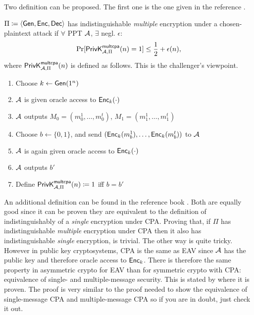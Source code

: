 \begin{solution}
  Two definition can be proposed.
  The first one is the one given in the reference \cite[p.~84]{katz2007introduction}.

  $\Pi \coloneqq \langle\operatorname{\mathsf{Gen}}, \operatorname{\mathsf{Enc}}, \operatorname{\mathsf{Dec}}\rangle$ has indistinguishable \emph{multiple} encryption under a chosen-plaintext attack
  if $\forall$ PPT $\mathcal{A}$, $\exists$ negl. $\epsilon$:
  \[ \Pr[\mathsf{PrivK}_{\mathcal{A},\Pi}^\mathsf{multcpa}(n) = 1] \leq \frac{1}{2} + \epsilon(n), \]
  where $\mathsf{PrivK}_{\mathcal{A},\Pi}^\mathsf{multcpa}(n)$ is defined as follows. This is the challenger's viewpoint.
  \begin{enumerate}
    \item Choose $k \leftarrow \operatorname{\mathsf{Gen}}(1^n)$
    \item $\mathcal{A}$ is given oracle access to $\operatorname{\mathsf{Enc}}_k(\cdot)$
    \item $\mathcal{A}$ outputs $M_0 = (m_0^1, \ldots, m_0^t)$, $M_1 = (m_1^1, \ldots, m_1^t)$
    \item Choose $b \leftarrow \{0,1\}$, and send $(\operatorname{\mathsf{Enc}}_k(m_b^1), \ldots, \operatorname{\mathsf{Enc}}_k(m_b^t))$ to $\mathcal{A}$
    \item $\mathcal{A}$ is again given oracle access to $\operatorname{\mathsf{Enc}}_k(\cdot)$
    \item $\mathcal{A}$ outputs $b'$
    \item Define $\mathsf{PrivK}_{\mathcal{A},\Pi}^\mathsf{multcpa}(n) \coloneqq 1$ iff $b = b'$
  \end{enumerate}

  An additional definition can be found in the reference book \cite[p.~75]{katz2007introduction}.
  Both are equally good since it can be proven they are equivalent to the definition of indistinguishably of a \emph{single} encryption
  under CPA.
  Proving that, if $\Pi$ has indistinguishable \emph{multiple} encryption under CPA then it also has indistinguishable \emph{single} encryption,
  is trivial.
  The other way is quite tricky.
  However in public key cryptosystems, CPA is the same as EAV since $\mathcal{A}$ has the public key and therefore oracle access to $\operatorname{\mathsf{Enc}}_k$.
  There is therefore the same property in asymmetric crypto for EAV than for symmetric crypto with CPA:
  equivalence of single- and multiple-message security.
  This is stated by \cite[theorem~11.6]{katz2007introduction} where it is proven.
  The proof is very similar to the proof needed to show the equivalence of single-message CPA and multiple-message CPA so if you are in doubt, just check it out.
\end{solution}



